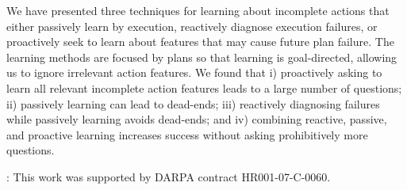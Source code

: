 \documentclass[letterpaper]{article}
\def\und#1{\noindent{\bf #1}:}
\renewcommand{\baselinestretch}{1.03}
\begin{document}
We have presented three techniques for learning about incomplete actions that
either passively learn by execution, reactively diagnose execution failures, or
proactively seek to learn about features that may cause future plan failure. 
The learning methods are focused by plans so that learning is goal-directed,
allowing us to ignore irrelevant action features.  We found that i) proactively
asking to learn all relevant incomplete action features leads to a large number
of questions; ii) passively learning can lead to dead-ends; iii) reactively
diagnosing failures while passively learning avoids dead-ends; and iv) combining
reactive, passive, and proactive learning increases success without asking
prohibitively more questions.


\smallskip

\und{Acknowledgements} This work was supported by DARPA contract HR001-07-C-0060.




\end{document}
